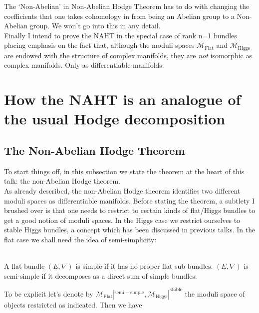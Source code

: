 The `Non-Abelian' in Non-Abelian Hodge Theorem has to do with changing the coefficients that one takes cohomology in from being an Abelian group  to a Non-Abelian group. We won't go into this in any detail.\\

Finally I intend to prove the NAHT in the special case of rank n=1 bundles placing emphasis on the fact that, although the moduli spaces $\mathcal{M}_{\mathrm{Flat}}$ and $\mathcal{M}_{\mathrm{Higgs}}$ are endowed with the structure of complex manifolds, they are \textit{not} isomorphic as complex manifolds. Only as differentiable manifolds.

\section{How the NAHT is an analogue of the usual Hodge decomposition}


\subsection{The Non-Abelian Hodge Theorem}

To start things off, in this subsection we state the theorem at the heart of this talk: the non-Abelian Hodge theorem.\\

As already described, the non-Abelian Hodge theorem identifies two different moduli spaces as differentiable manifolds. Before stating the theorem, a subtlety I brushed over is that one needs to restrict to certain kinds of flat/Higgs bundles to get a good notion of moduli spaces. In the Higgs case we restrict ourselves to stable Higgs bundles, a concept which has been discussed in previous talks. In the flat case we shall need the idea of semi-simplicity:

\begin{definition}\ \\
A flat bundle $(E, \nabla)$ is simple if it has no proper flat sub-bundles. $(E, \nabla)$ is semi-simple if it decomposes as a direct sum of simple bundles.
\end{definition}

To be explicit let's denote by $\mathcal{M}_{\mathrm{Flat}}|^{\mathrm{semi-simple}},\mathcal{M}_{\mathrm{Higgs}}|^{\mathrm{stable}}$ the moduli space of objects restricted as indicated. Then we have

